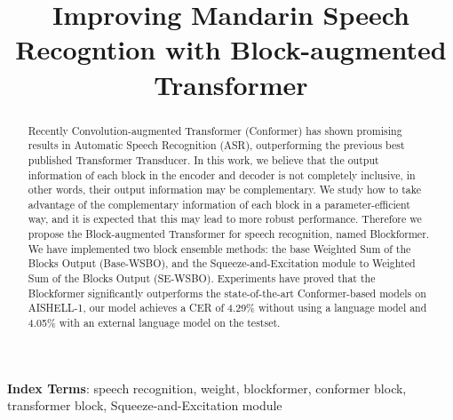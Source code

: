 \documentclass[a4paper]{article}
\title{Improving Mandarin Speech Recogntion with Block-augmented Transformer}
\begin{document}
\maketitle




\begin{abstract}
  Recently Convolution-augmented Transformer (Conformer)\cite{gulati2020conformer} has shown promising results in Automatic Speech Recognition (ASR), outperforming the previous best published Transformer Transducer\cite{Zhang2020TransformerTA}. In this work, we believe that the output information of each block in the encoder and decoder is not completely inclusive, in other words, their output information may be complementary. We study how to take advantage of the complementary information of each block in a parameter-efficient way, and it is expected that this may lead to more robust performance. Therefore we propose the Block-augmented Transformer for speech recognition, named Blockformer. We have implemented two block ensemble methods: the base Weighted Sum of the Blocks Output (Base-WSBO), and the Squeeze-and-Excitation module\cite{Hu2020SqueezeandExcitationN} to Weighted Sum of the Blocks Output (SE-WSBO). Experiments have proved that the Blockformer significantly outperforms the state-of-the-art Conformer-based models on AISHELL-1, our model achieves a CER of 4.29\% without using a language model and 4.05\% with an external language model on the testset. 
\end{abstract}
\noindent\textbf{Index Terms}: speech recognition, weight, blockformer, conformer block, transformer block, Squeeze-and-Excitation module
\end{document}

